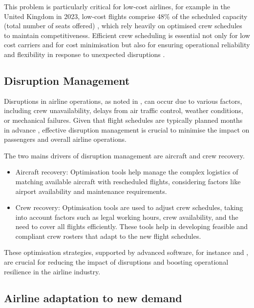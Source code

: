 \documentclass[conference]{IEEEtran}
\begin{document}
This problem is particularly critical for low-cost airlines, for example in the United Kingdom in 2023, low-cost flights comprise 48\% of the scheduled capacity (total number of seats offered) \cite{lcc_new_norm}, which rely heavily on optimised crew schedules to maintain competitiveness. Efficient crew scheduling is essential not only for low cost carriers and for cost minimisation but also for ensuring operational reliability and flexibility in response to unexpected disruptions \cite{ryanair_youtube_report}.


\subsection{Disruption Management} %
\label{sub:disruption management}

Disruptions in airline operations, as noted in \cite{disruption_management}, can occur due to various factors, including crew unavailability, delays from air traffic control, weather conditions, or mechanical failures. Given that flight schedules are typically planned months in advance \cite{flight_scheduling}, effective disruption management is crucial to minimise the impact on passengers and overall airline operations.

The two mains drivers of disruption management are aircraft and crew recovery.
\begin{itemize}
    \item Aircraft recovery: Optimisation tools help manage the complex logistics of matching available aircraft with rescheduled flights, considering factors like airport availability and maintenance requirements.
    \item Crew recovery: Optimisation tools are used to adjust crew schedules, taking into account factors such as legal working hours, crew availability, and the need to cover all flights efficiently. These tools help in developing feasible and compliant crew rosters that adapt to the new flight schedules.
\end{itemize}

These optimisation strategies, supported by advanced software, for instance \cite{inform_software} and \cite{ibs_software}, are crucial for reducing the impact of disruptions and boosting operational resilience in the airline industry.

\subsection{Airline adaptation to new demand} %
\label{sub:Airline adaptation to new demand}
\end{document}
